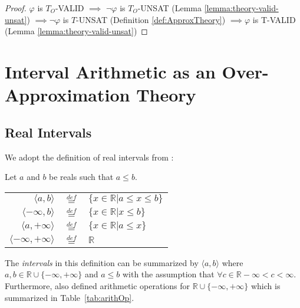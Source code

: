 \begin{proof}
$\varphi$ is $T_O$-VALID $\implies$ $\neg\varphi$ is $T_O$-UNSAT (Lemma \ref{lemma:theory-valid-unsat}) $\implies \neg\varphi$ is $T$-UNSAT (Definition \ref{def:ApproxTheory}) $\implies \varphi$ is T-VALID (Lemma \ref{lemma:theory-valid-unsat})
\end{proof}


\section{Interval Arithmetic as an Over-Approximation Theory}\label{sec:IA}
\subsection{Real Intervals}
We adopt the definition of real intervals from \cite{Hickey:2001:IAP:502102.502106}:
\begin{definition}\cite{Hickey:2001:IAP:502102.502106}
Let $a$ and $b$ be reals such that $a \le b$.
\begin{center}
\begin{tabular}{ r c l }
  $\langle a, b \rangle$ & $\overset{def}{=}$ & $\{x \in \mathbb{R} | a \le x \le b\}$ \\
  $\langle -\infty, b \rangle$ & $\overset{def}{=}$ & $\{x \in \mathbb{R} | x \le b\}$ \\
  $\langle a, +\infty \rangle$ & $\overset{def}{=}$ & $\{x \in \mathbb{R} | a \le x\}$ \\  
  $\langle -\infty, +\infty \rangle$ & $\overset{def}{=}$ & $\mathbb{R}$ \\  
\end{tabular}
\end{center}
\end{definition}
The \emph{intervals} in this definition can be summarized by $\langle a, b \rangle$ where $a, b \in \mathbb{R} \cup \{-\infty, +\infty\}$ and $a \le b$ with the assumption that $\forall c \in \mathbb{R}-\infty < c < \infty$. Furthermore, \citet{Hickey:2001:IAP:502102.502106} also defined arithmetic operations for $\mathbb{R} \cup \{-\infty, +\infty\}$ which is summarized in Table~\ref{tab:arithOp}.


